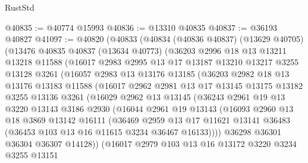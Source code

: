 \begin{lexlean}{RustStd}
\begin{coremodule}
@40835 := @40774 @15993
@40836 := @13310 @40835
@40837 := @36193 @40827
@41097 := @40820
    (@40833
      (@40834
        (@40836 @40837)
        (@13629 @40705)
        (@13476
          @40835
          @40837
          (@13634 @40773)
          (@36203
            @2996
            @18
            @13
            @13211
            @13218
            @11588
            (@16017
              @2983
              @2995
              @13
              @17
              @13187
              @13210
              @13217
              @3255
              @13128
              @3261
              (@16057
                @2983
                @13
                @13176
                @13185
                (@36203
                  @2982
                  @18
                  @13
                  @13176
                  @13183
                  @11588
                  (@16017
                    @2962
                    @2981
                    @13
                    @17
                    @13145
                    @13175
                    @13182
                    @3255
                    @13136
                    @3261
                    (@16029
                      @2962
                      @13
                      @13145
                      (@36243
                        @2961
                        @19
                        @13
                        @3220
                        @13143
                        @3186
                        @2930
                        (@16044
                          @2961
                          @19
                          @13143
                          (@16093
                            @2960
                            @13
                            @18
                            @3869
                            @13142
                            @16111
                            (@36469
                              @2959
                              @13
                              @17
                              @11621
                              @13141
                              @36483
                              (@36453 @103 @13 @16 @11615 @3234 @36467 @16133))))
                        @36298
                        @36301
                        @36304
                        @36307
                        @14128))
                    (@16017
                      @2979
                      @103
                      @13
                      @16
                      @13172
                      @3220
                      @3234
                      @3255
                      @13151

\end{coremodule}
\end{lexlean}
